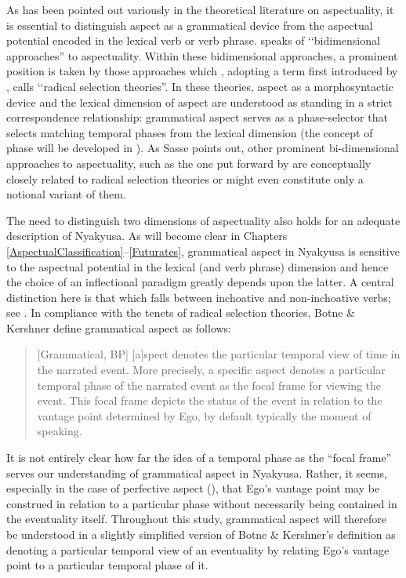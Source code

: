 \newpage 
As has been pointed out variously in the theoretical literature on aspectuality, it is essential to distinguish aspect as a grammatical device from the aspectual potential encoded in the lexical verb or verb phrase. \citet{SasseHJ2002} speaks of \lq\lq bidimensional approaches'' to aspectuality. Within these bidimensional approaches, a prominent position is taken by those approaches which \citet{SasseHJ2002}, adopting a term first introduced by \citet{BickelB1997}, calls \lq\lq radical selection theories''. In these theories, aspect as a morphosyntactic device and the lexical dimension of aspect are understood as standing in a strict correspondence relationship: grammatical aspect serves as a phase-selector that selects matching temporal phases from the lexical dimension (the concept of phase will be developed in ). As Sasse points out, other prominent bi-dimensional approaches to aspectuality, such as the one put forward by \citet{SmithC1997} are conceptually closely related to radical selection theories or might even constitute only a notional variant of them.

The need to distinguish two dimensions of aspectuality also holds for an adequate description of Nyakyusa. As will become clear in Chapters \ref{AspectualClassification}--\ref{Futurates}, grammatical aspect in Nyakyusa is sensitive to the aspectual potential in the lexical (and verb phrase) dimension and hence the choice of an inflectional paradigm greatly depends upon the latter. A central distinction here is that which falls between inchoative and non-inchoative verbs; see . In compliance with the tenets of radical selection theories, Botne \& Kershner define grammatical aspect as follows:

\begin{quote}
[Grammatical, BP] [a]spect denotes the particular temporal view of time in the narrated event. More precisely, a speciﬁc aspect denotes a particular temporal phase of the narrated event as the focal frame for viewing the event. This focal frame depicts the status of the event in relation to the vantage point determined by Ego, by default typically the moment of speaking. \citep[171]{BotneRKershnerT2008}
\end{quote}

It is not entirely clear how far the idea of a temporal phase as the ``focal frame'' serves our understanding of grammatical aspect in Nyakyusa. Rather, it seems, especially in the case of perfective aspect (), that Ego's vantage point may be construed in relation to a particular phase without necessarily being contained in the eventuality itself. Throughout this study, grammatical aspect will therefore be understood in a slightly simplified version of Botne \& Kershner's definition as denoting a particular temporal view of an eventuality by relating Ego's vantage point to a particular temporal phase of it.

